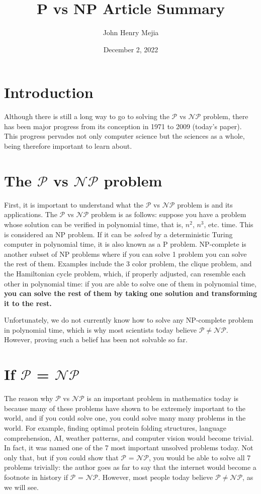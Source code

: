 \documentclass[11pt]{article}
\title{P vs NP Article Summary}
\author{John Henry Mejia}
\date{December 2, 2022}
\begin{document}
\maketitle

\section{Introduction}
Although there is still a long way to go to solving the $\mathcal{P}$ vs $\mathcal{NP}$ problem, there has been major progress from its conception in 1971 to 2009 (today's paper). This progress pervades not only computer science but the sciences as a whole, being therefore important to learn about. 
\section{The $\mathcal{P}$ vs $\mathcal{NP}$ problem}

First, it is important to understand what the $\mathcal{P}$ vs $\mathcal{NP}$ problem is and its applications. The $\mathcal{P}$ vs $\mathcal{NP}$ problem is as follows: suppose you have a problem whose solution can be verified in polynomial time, that is, $n^2$, $n^3$, etc. time. This is considered an NP problem. If it can be \textit{solved} by a deterministic Turing computer in polynomial time, it is also known as a P problem. NP-complete is another subset of NP problems where if you can solve 1 problem you can solve the rest of them. Examples include the 3 color problem, the clique problem, and the Hamiltonian cycle problem, which, if properly adjusted, can resemble each other in polynomial time: if you are able to solve one of them in polynomial time, \textbf{you can solve the rest of them by taking one solution and transforming it to the rest.} 

Unfortunately, we do not currently know how to solve any NP-complete problem in polynomial time, which is why most scientists today believe $\mathcal{P} \neq \mathcal{NP}$. However, proving such a belief has been not solvable so far.
\section {If $\mathcal{P}$ = $\mathcal{NP}$}
The reason why $\mathcal{P}$ vs $\mathcal{NP}$ is an important problem in mathematics today is because many of these problems have shown to be extremely important to the world, and if you could solve one, you could solve many many problems in the world. For example, finding optimal protein folding structures, language comprehension, AI, weather patterns, and computer vision would become trivial. In fact, it was named one of the 7 most important unsolved problems today. Not only that, but if you could show that $\mathcal{P}$ = $\mathcal{NP}$, you would be able to solve all 7 problems trivially: the author goes as far to say that the internet would become a footnote in history if $\mathcal{P}$ = $\mathcal{NP}$. However, most people today believe $\mathcal{P} \neq \mathcal{NP}$, as we will see.
\end{document}
